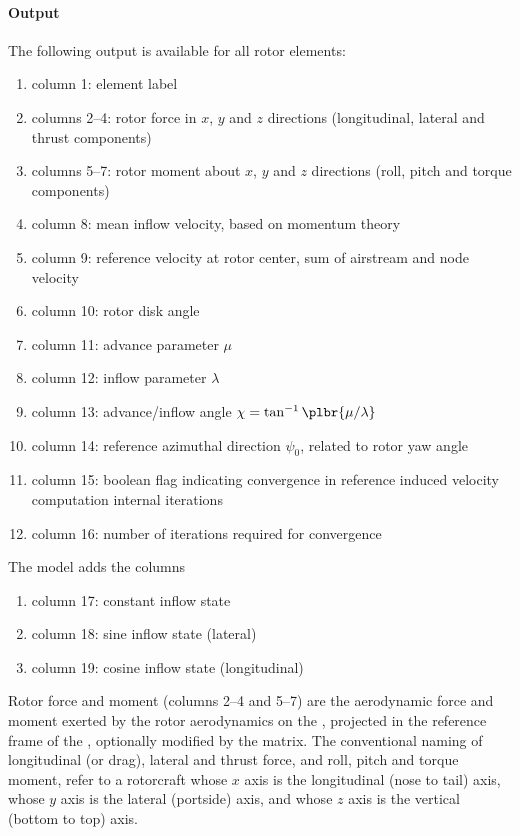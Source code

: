 \paragraph{Output}
The following output is available for all rotor elements:
\begin{enumerate}
\item column 1: element label
\item columns 2--4: rotor force in $x$, $y$ and $z$ directions
	(longitudinal, lateral and thrust components)
\item columns 5--7: rotor moment about $x$, $y$ and $z$ directions
	(roll, pitch and torque components)
\item column 8: mean inflow velocity, based on momentum theory
\item column 9: reference velocity at rotor center, sum of airstream
	and  node velocity
\item column 10: rotor disk angle
\item column 11: advance parameter $\mu$
\item column 12: inflow parameter $\lambda$
\item column 13: advance/inflow angle $\chi=\tan^{-1}\plbr{\mu/\lambda}$
\item column 14: reference azimuthal direction $\psi_0$,
	related to rotor yaw angle
\item column 15: boolean flag indicating convergence
	in reference induced velocity computation internal iterations
\item column 16: number of iterations required for convergence
\setcounter{elem_rotor_output}{\value{enumi}}
\end{enumerate}
The  model adds the columns
\begin{enumerate}
\setcounter{enumi}{\value{elem_rotor_output}}
\item column 17: constant inflow state
\item column 18: sine inflow state (lateral)
\item column 19: cosine inflow state (longitudinal)
\end{enumerate}
Rotor force and moment (columns 2--4 and 5--7) are the aerodynamic
force and moment exerted by the rotor aerodynamics on the ,
projected in the reference frame of the ,
optionally modified by the  matrix.
The conventional naming of longitudinal (or drag), lateral and thrust force,
and roll, pitch and torque moment, refer to a rotorcraft
whose $x$ axis is the longitudinal (nose to tail) axis,
whose $y$ axis is the lateral (portside) axis,
and whose $z$ axis is the vertical (bottom to top) axis.

